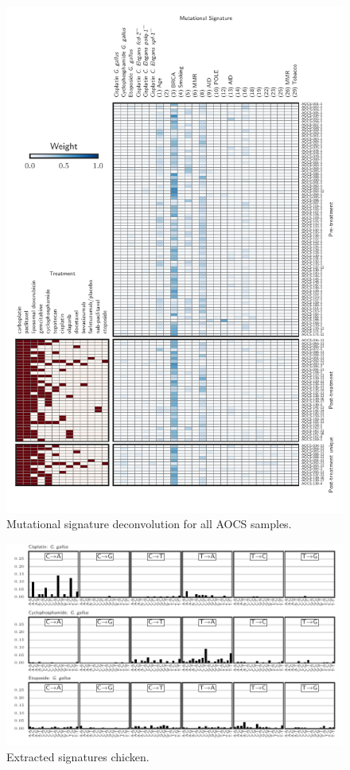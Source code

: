 \begin{figure}
\centering
\includegraphics[scale=1.0]{figures/supplementary_signatures.pdf}
\caption{Mutational signature deconvolution for all AOCS samples. }
\label{sfig:supp_signatures}
\end{figure}

\begin{figure}
\centering
\includegraphics[scale=1.0]{figures/extracted_signatures_chicken.pdf}
\caption{Extracted signatures chicken. }
\label{sfig:supp_extracted_signatures_chicken}
\end{figure}

